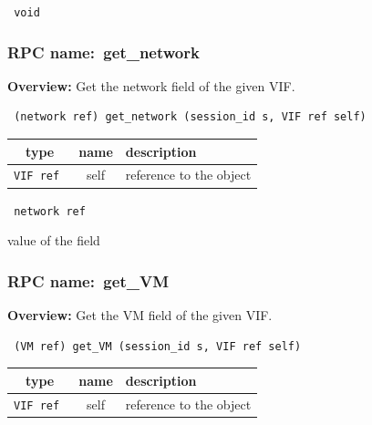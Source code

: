 \vspace{0.3cm}

{\tt 
void
}



\vspace{0.3cm}
\vspace{0.3cm}
\vspace{0.3cm}
\subsubsection{RPC name:~get\_network}

{\bf Overview:} 
Get the network field of the given VIF.

\begin{verbatim} (network ref) get_network (session_id s, VIF ref self)\end{verbatim}



 
\vspace{0.3cm}
\begin{tabular}{|c|c|p{7cm}|}
 \hline
{\bf type} & {\bf name} & {\bf description} \\ \hline
{\tt VIF ref } & self & reference to the object \\ \hline 

\end{tabular}

\vspace{0.3cm}

{\tt 
network ref
}


value of the field
\vspace{0.3cm}
\vspace{0.3cm}
\vspace{0.3cm}
\subsubsection{RPC name:~get\_VM}

{\bf Overview:} 
Get the VM field of the given VIF.

\begin{verbatim} (VM ref) get_VM (session_id s, VIF ref self)\end{verbatim}



 
\vspace{0.3cm}
\begin{tabular}{|c|c|p{7cm}|}
 \hline
{\bf type} & {\bf name} & {\bf description} \\ \hline
{\tt VIF ref } & self & reference to the object \\ \hline 

\end{tabular}

